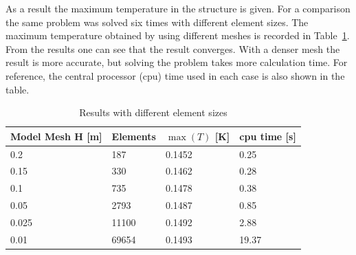 As a result the maximum temperature in the structure is given. For a
comparison the same problem was solved six times with different
element sizes. The maximum temperature obtained by using different
meshes is recorded in Table~\ref{tb:struct1}.  From the results one
can see that the result converges. With a denser mesh the result is
more accurate, but solving the problem takes more calculation time.
For reference, the central processor (cpu) time used in each case is
also shown in the table.

\begin{table}
\caption{Results with different element sizes}
\label{tb:struct1}
\begin{center}
\begin{tabular}{llll} \hline
Model Mesh H [m]  & Elements & $\max (T)$ [K] & cpu time [s]\\ \hline
0.2 & 187 &  0.1452  & 0.25 \\
0.15 & 330 & 0.1462  & 0.28 \\ 
0.1 &  735 & 0.1478  & 0.38 \\
0.05 & 2793 & 0.1487  & 0.85 \\ 
0.025 & 11100 & 0.1492 & 2.88 \\ 
0.01  & 69654 & 0.1493 & 19.37 \\ \hline
\end{tabular}
\end{center}
\end{table}

\hfill



